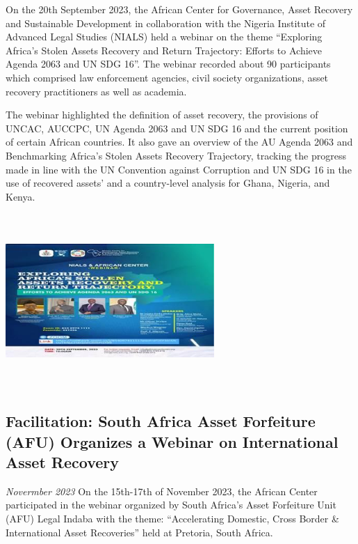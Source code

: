 \documentclass[
  letterpaper,
  DIV=11,
  numbers=noendperiod]{scrreprt}
\begin{document}
On the 20th September 2023, the African Center for Governance, Asset
Recovery and Sustainable Development in collaboration with the Nigeria
Institute of Advanced Legal Studies (NIALS) held a webinar on the theme
``Exploring Africa's Stolen Assets Recovery and Return Trajectory:
Efforts to Achieve Agenda 2063 and UN SDG 16''. The webinar recorded
about 90 participants which comprised law enforcement agencies, civil
society organizations, asset recovery practitioners as well as academia.

The webinar highlighted the definition of asset recovery, the provisions
of UNCAC, AUCCPC, UN Agenda 2063 and UN SDG 16 and the current position
of certain African countries. It also gave an overview of the AU Agenda
2063 and Benchmarking Africa's Stolen Assets Recovery Trajectory,
tracking the progress made in line with the UN Convention against
Corruption and UN SDG 16 in the use of recovered assets' and a
country-level analysis for Ghana, Nigeria, and Kenya.

\begin{center}
\includegraphics[width=3.125in,height=2.60417in]{images/return/02_web.jpg}
\end{center}

\subsection{Facilitation: South Africa Asset Forfeiture (AFU) Organizes
a Webinar on International Asset
Recovery}\label{facilitation-south-africa-asset-forfeiture-afu-organizes-a-webinar-on-international-asset-recovery}

\emph{Novermber 2023} On the 15th-17th of November 2023, the African
Center participated in the webinar organized by South Africa's Asset
Forfeiture Unit (AFU) Legal Indaba with the theme: ``Accelerating
Domestic, Cross Border \& International Asset Recoveries'' held at
Pretoria, South Africa.
\end{document}
